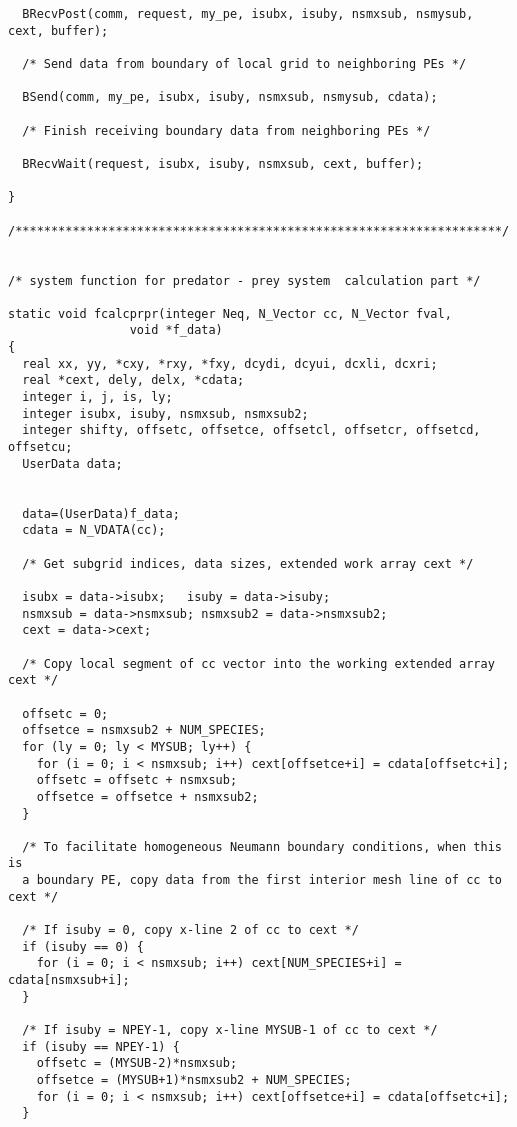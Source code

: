 \documentclass[11pt]{article}
\begin{document}
\begin{verbatim}
  BRecvPost(comm, request, my_pe, isubx, isuby, nsmxsub, nsmysub, cext, buffer);

  /* Send data from boundary of local grid to neighboring PEs */

  BSend(comm, my_pe, isubx, isuby, nsmxsub, nsmysub, cdata);

  /* Finish receiving boundary data from neighboring PEs */

  BRecvWait(request, isubx, isuby, nsmxsub, cext, buffer);

}

/********************************************************************/


/* system function for predator - prey system  calculation part */

static void fcalcprpr(integer Neq, N_Vector cc, N_Vector fval, 
                 void *f_data)
{
  real xx, yy, *cxy, *rxy, *fxy, dcydi, dcyui, dcxli, dcxri;
  real *cext, dely, delx, *cdata;
  integer i, j, is, ly;
  integer isubx, isuby, nsmxsub, nsmxsub2;
  integer shifty, offsetc, offsetce, offsetcl, offsetcr, offsetcd, offsetcu;
  UserData data;


  data=(UserData)f_data;
  cdata = N_VDATA(cc);

  /* Get subgrid indices, data sizes, extended work array cext */

  isubx = data->isubx;   isuby = data->isuby;
  nsmxsub = data->nsmxsub; nsmxsub2 = data->nsmxsub2;
  cext = data->cext;

  /* Copy local segment of cc vector into the working extended array cext */

  offsetc = 0;
  offsetce = nsmxsub2 + NUM_SPECIES;
  for (ly = 0; ly < MYSUB; ly++) {
    for (i = 0; i < nsmxsub; i++) cext[offsetce+i] = cdata[offsetc+i];
    offsetc = offsetc + nsmxsub;
    offsetce = offsetce + nsmxsub2;
  }

  /* To facilitate homogeneous Neumann boundary conditions, when this is
  a boundary PE, copy data from the first interior mesh line of cc to cext */

  /* If isuby = 0, copy x-line 2 of cc to cext */
  if (isuby == 0) {
    for (i = 0; i < nsmxsub; i++) cext[NUM_SPECIES+i] = cdata[nsmxsub+i];
  }

  /* If isuby = NPEY-1, copy x-line MYSUB-1 of cc to cext */
  if (isuby == NPEY-1) {
    offsetc = (MYSUB-2)*nsmxsub;
    offsetce = (MYSUB+1)*nsmxsub2 + NUM_SPECIES;
    for (i = 0; i < nsmxsub; i++) cext[offsetce+i] = cdata[offsetc+i];
  }


\end{verbatim}
\end{document}

